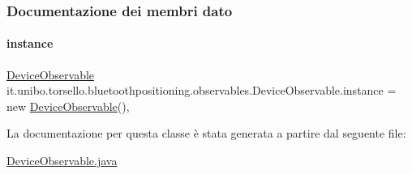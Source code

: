 \subsubsection{Documentazione dei membri dato}
\hypertarget{classit_1_1unibo_1_1torsello_1_1bluetoothpositioning_1_1observables_1_1DeviceObservable_a43120f0ae1d6ae6c543219ec42df15e2_a43120f0ae1d6ae6c543219ec42df15e2}{}\label{classit_1_1unibo_1_1torsello_1_1bluetoothpositioning_1_1observables_1_1DeviceObservable_a43120f0ae1d6ae6c543219ec42df15e2_a43120f0ae1d6ae6c543219ec42df15e2} 
\paragraph{\texorpdfstring{instance}{instance}}
{\footnotesize\ttfamily \hyperlink{classit_1_1unibo_1_1torsello_1_1bluetoothpositioning_1_1observables_1_1DeviceObservable}{Device\+Observable} it.\+unibo.\+torsello.\+bluetoothpositioning.\+observables.\+Device\+Observable.\+instance = new \hyperlink{classit_1_1unibo_1_1torsello_1_1bluetoothpositioning_1_1observables_1_1DeviceObservable}{Device\+Observable}()\hspace{0.3cm}{\ttfamily [static]}, {\ttfamily [private]}}



La documentazione per questa classe è stata generata a partire dal seguente file\+:\begin{DoxyCompactItemize}
\item 
\hyperlink{DeviceObservable_8java}{Device\+Observable.\+java}\end{DoxyCompactItemize}
